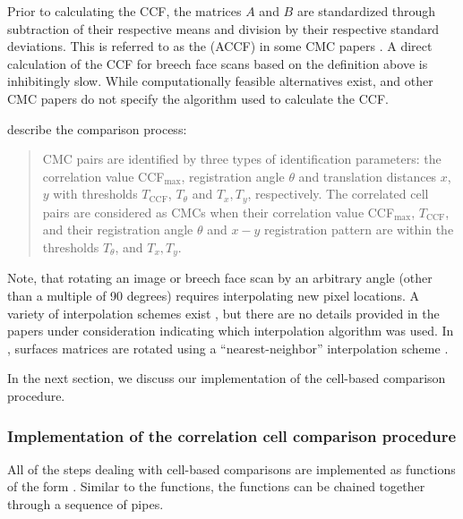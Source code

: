 Prior to calculating the CCF, the matrices \(A\) and \(B\) are
standardized through subtraction of their respective means and division
by their respective standard deviations. This is referred to as the
 (ACCF) in some CMC papers
\citep{ott_applying_2017}. A direct calculation of the CCF for breech
face scans based on the definition above is inhibitingly slow. While
computationally feasible alternatives exist, \citet{song_proposed_2013}
and other CMC papers do not specify the algorithm used to calculate the
CCF.

\citet{song_3d_2014} describe the comparison process:

\begin{quote}
CMC pairs are identified by three types of identification parameters:
the correlation value CCF\(_{\max}\), registration angle \(\theta\) and
translation distances \(x\), \(y\) with thresholds \(T_{\text{CCF}}\),
\(T_\theta\) and \(T_x, T_y\), respectively. The correlated cell pairs
are considered as CMCs when their correlation value CCF\(_{\max}\),
\(T_{\text{CCF}}\), and their registration angle \(\theta\) and \(x-y\)
registration pattern are within the thresholds \(T_\theta\), and
\(T_x, T_y\).
\end{quote}

Note, that rotating an image or breech face scan by an arbitrary angle
(other than a multiple of 90 degrees) requires interpolating new pixel
locations. A variety of interpolation schemes exist
\citep{parker_comparison_1983}, but there are no details provided in the
papers under consideration indicating which interpolation algorithm was
used. In , surfaces matrices are rotated using a
``nearest-neighbor'' interpolation scheme \citep{imager}.

In the next section, we discuss our implementation of the cell-based
comparison procedure.

\hypertarget{implementation-of-the-correlation-cell-comparison-procedure}{%
\subsubsection{Implementation of the correlation cell comparison
procedure}\label{implementation-of-the-correlation-cell-comparison-procedure}}

All of the steps dealing with cell-based comparisons are implemented as
functions of the form . Similar to the
 functions, the  functions can
be chained together through a sequence of pipes.

